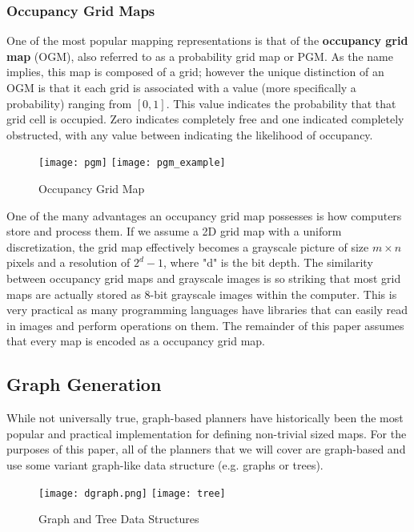 \subsubsection{Occupancy Grid Maps}

One of the most popular mapping representations is that of the \textbf{occupancy grid map} (OGM), also referred to as a probability grid map or PGM. As the name implies, this map is composed of a grid; however the unique distinction of an OGM is that it each grid is associated with a value (more specifically a probability) ranging from $[0, 1]$. This value indicates the probability that that grid cell is occupied. Zero indicates completely free and one indicated completely obstructed, with any value between indicating the likelihood of occupancy. 


\begin{figure}[h]
  \texttt{[image: pgm]}
  \texttt{[image: pgm\_example]}
  \centering
  \label{fig:grid_map}
  \caption{Occupancy Grid Map}
\end{figure}



One of the many advantages an occupancy grid map possesses is how computers store and process them. If we assume a 2D grid map with a uniform discretization, the grid map effectively becomes a grayscale picture of size $m \times n$ pixels and a resolution of $2^d-1$, where "d" is the bit depth. The similarity between occupancy grid maps and grayscale images is so striking that most grid maps are actually stored as 8-bit grayscale images within the computer. This is very practical as many programming languages have libraries that can easily read in images and perform operations on them. The remainder of this paper assumes that every map is encoded as a occupancy grid map. 

\subsection{Graph Generation}
While not universally true, graph-based planners have historically been the most popular and practical implementation for defining non-trivial sized maps. For the purposes of this paper, all of the planners that we will cover are graph-based and use some variant graph-like data structure (e.g. graphs or trees). 

\begin{figure}[h]
  \texttt{[image: dgraph.png]}
  \texttt{[image: tree]}
  \centering
  \label{fig:graph}
  \caption{Graph and Tree Data Structures}
\end{figure}

